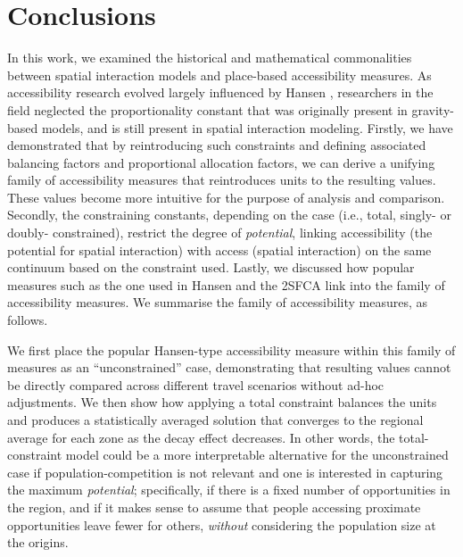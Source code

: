 \documentclass[
  10pt,
  letterpaper,
]{article}
\begin{document}
\section{Conclusions}\label{conclusions}

In this work, we examined the historical and mathematical commonalities
between spatial interaction models and place-based accessibility
measures. As accessibility research evolved largely influenced by Hansen
\citep{hansen1959}, researchers in the field neglected the
proportionality constant that was originally present in gravity-based
models, and is still present in spatial interaction modeling. Firstly,
we have demonstrated that by reintroducing such constraints and defining
associated balancing factors and proportional allocation factors, we can
derive a unifying family of accessibility measures that reintroduces
units to the resulting values. These values become more intuitive for
the purpose of analysis and comparison. Secondly, the constraining
constants, depending on the case (i.e., total, singly- or doubly-
constrained), restrict the degree of \emph{potential}, linking
accessibility (the potential for spatial interaction) with access
(spatial interaction) on the same continuum based on the constraint
used. Lastly, we discussed how popular measures such as the one used in
Hansen \citep{hansen1959} and the 2SFCA link into the family of
accessibility measures. We summarise the family of accessibility
measures, as follows.

We first place the popular Hansen-type accessibility measure
\citep{hansen1959} within this family of measures as an
``unconstrained'' case, demonstrating that resulting values cannot be
directly compared across different travel scenarios without ad-hoc
adjustments. We then show how applying a total constraint balances the
units and produces a statistically averaged solution that converges to
the regional average for each zone as the decay effect decreases. In
other words, the total-constraint model could be a more interpretable
alternative for the unconstrained case if population-competition is not
relevant and one is interested in capturing the maximum
\emph{potential}; specifically, if there is a fixed number of
opportunities in the region, and if it makes sense to assume that people
accessing proximate opportunities leave fewer for others, \emph{without}
considering the population size at the origins.
\end{document}
